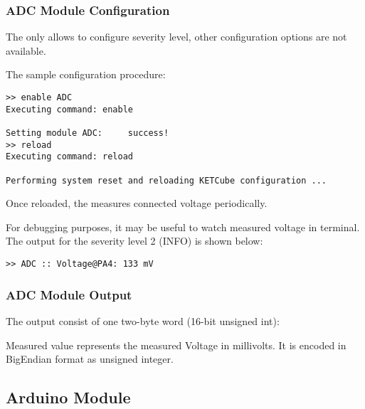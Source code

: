 \subsubsection{ADC Module Configuration}
  The  only allows to configure severity level, other configuration options are not available.
  
  The sample configuration procedure:
  
\begin{docCodeExample}
\begin{verbatim}
>> enable ADC
Executing command: enable

Setting module ADC:     success!
>> reload
Executing command: reload

Performing system reset and reloading KETCube configuration ...
\end{verbatim}
\end{docCodeExample}
  
  Once reloaded, the  measures connected voltage periodically. 
  
  For debugging purposes, it may be useful to watch measured voltage in terminal. The output for the severity level 2 (INFO) is shown below:
  
\begin{docCodeExample}
\begin{verbatim}
>> ADC :: Voltage@PA4: 133 mV
\end{verbatim}
\end{docCodeExample}

\subsubsection{ADC Module Output}
  The  output consist of one two-byte word (16-bit unsigned int):
  

  Measured value represents the measured Voltage in millivolts. It is encoded in BigEndian format as unsigned integer.

\clearpage
\subsection{Arduino Module}


